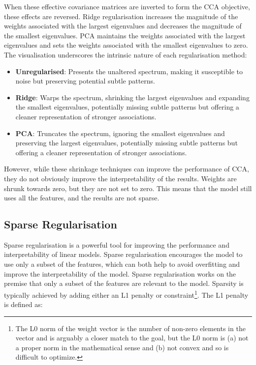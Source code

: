 When these effective covariance matrices are inverted to form the CCA objective, these effects are reversed.
Ridge regularisation increases the magnitude of the weights associated with the largest eigenvalues and decreases the magnitude of the smallest eigenvalues.
PCA maintains the weights associated with the largest eigenvalues and sets the weights associated with the smallest eigenvalues to zero.
The visualisation underscores the intrinsic nature of each regularisation method:
\begin{itemize}
    \item \textbf{Unregularised}: Presents the unaltered spectrum, making it susceptible to noise but preserving potential subtle patterns.
    \item \textbf{Ridge}: Warps the spectrum, shrinking the largest eigenvalues and expanding the smallest eigenvalues, potentially missing subtle patterns but offering a cleaner representation of stronger associations.
    \item \textbf{PCA}: Truncates the spectrum, ignoring the smallest eigenvalues and preserving the largest eigenvalues, potentially missing subtle patterns but offering a cleaner representation of stronger associations.
\end{itemize}

However, while these shrinkage techniques can improve the performance of CCA, they do not obviously improve the interpretability of the results.
Weights are shrunk towards zero, but they are not set to zero.
This means that the model still uses all the features, and the results are not sparse.

\subsection{Sparse Regularisation}

Sparse regularisation is a powerful tool for improving the performance and interpretability of linear models.
Sparse regularisation encourages the model to use only a subset of the features, which can both help to avoid overfitting and improve the interpretability of the model.
Sparse regularisation works on the premise that only a subset of the features are relevant to the model.
Sparsity is typically achieved by adding either an L1 penalty or constraint\footnote{The L0 norm of the weight vector is the number of non-zero elements in the vector and is arguably a closer match to the goal, but the L0 norm is (a) not a proper norm in the mathematical sense and (b) not convex and so is difficult to optimize.}.
The L1 penalty is defined as:

